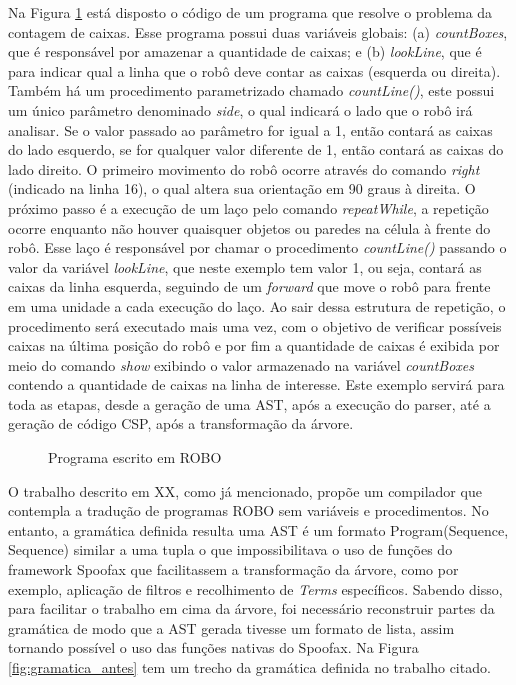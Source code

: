 Na Figura \ref{fig:roboprogram} está disposto o código de um programa que resolve o problema da contagem de caixas. Esse programa possui duas variáveis globais: (a) \textit{countBoxes}, que é responsável por amazenar a quantidade de caixas; e (b) \textit{lookLine}, que é para indicar qual a linha que o robô deve contar as caixas (esquerda ou direita). Também há um procedimento parametrizado chamado \textit{countLine()}, este possui um único parâmetro denominado \textit{side}, o qual indicará o lado que o robô irá analisar. Se o valor passado ao parâmetro for igual a 1, então contará as caixas do lado esquerdo, se for qualquer valor diferente de 1, então contará as caixas do lado direito. O primeiro movimento do robô ocorre através do comando \textit{right} (indicado na linha 16), o qual altera sua orientação em 90 graus à direita. O próximo passo é a execução de um laço pelo comando \textit{repeatWhile}, a repetição ocorre enquanto não houver quaisquer objetos ou paredes na célula à frente do robô. Esse laço é responsável por chamar o procedimento \textit{countLine()} passando o valor da variável \textit{lookLine}, que neste exemplo tem valor 1, ou seja, contará as caixas da linha esquerda, seguindo de um \textit{forward} que move o robô para frente em uma unidade a cada execução do laço. Ao sair dessa estrutura de repetição, o procedimento será executado mais uma vez, com o objetivo de verificar possíveis caixas na última posição do robô e por fim a quantidade de caixas é exibida por meio do comando \textit{show} exibindo o valor armazenado na variável \textit{countBoxes} contendo a quantidade de caixas na linha de interesse. Este exemplo servirá para toda as etapas, desde a geração de uma AST, após a execução do parser, até a geração de código CSP, após a transformação da árvore.

\begin{figure}[h]

\caption{Programa escrito em ROBO}
\label{fig:roboprogram}
\end{figure}

O trabalho descrito em XX, como já mencionado, propõe um compilador que contempla a tradução de programas ROBO sem variáveis e procedimentos. No entanto, a gramática definida resulta uma AST é um formato  Program(Sequence, Sequence) similar a uma tupla o que impossibilitava o uso de funções do framework Spoofax que facilitassem a transformação da árvore, como por exemplo, aplicação de filtros e recolhimento de \textit{Terms} específicos. Sabendo disso, para facilitar o trabalho em cima da árvore, foi necessário reconstruir partes da gramática de modo que a AST gerada tivesse um formato de lista, assim tornando possível o uso das funções nativas do Spoofax. Na Figura \ref{fig:gramatica_antes} tem um trecho da gramática definida no trabalho citado.

